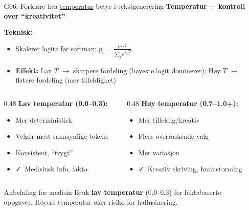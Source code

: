 \documentclass[aspectratio=169, 10pt]{beamer}
\begin{document}
\begin{frame}{G06: Forklare hva \href{https://en.wikipedia.org/wiki/Softmax_function\#Softmax_temperature}{temperatur} betyr i tekstgenerering}
    \textbf{Temperatur = kontroll over ``kreativitet''}

    \vspace{0.15cm}
    \textbf{Teknisk:}
    \begin{itemize}
        \item Skalerer logits før softmax: $p_i = \frac{e^{z_i/T}}{\sum_j e^{z_j/T}}$
        \item \textbf{Effekt:} Lav $T$ $\rightarrow$ skarpere fordeling (høyeste logit dominerer); Høy $T$ $\rightarrow$ flatere fordeling (mer tilfeldighet)
    \end{itemize}

    \vspace{0.2cm}
    \begin{columns}[T]
        \begin{column}{0.48\textwidth}
            \textbf{Lav temperatur (0.0--0.3):}
            \begin{itemize}
                \item Mer deterministisk
                \item Velger mest sannsynlige tokens
                \item Konsistent, ``trygt''
                \item \faCheck~Medisinsk info, fakta
            \end{itemize}
        \end{column}
        \begin{column}{0.48\textwidth}
            \textbf{Høy temperatur (0.7--1.0+):}
            \begin{itemize}
                \item Mer tilfeldig/kreativ
                \item Flere overraskende valg
                \item Mer variasjon
                \item \faCheck~Kreativ skriving, brainstorming
            \end{itemize}
        \end{column}
    \end{columns}

    \vspace{0.15cm}
    \begin{block}{\footnotesize Anbefaling for medisin}
        \footnotesize Bruk \textbf{lav temperatur} (0.0--0.3) for faktabaserte oppgaver. Høyere temperatur øker risiko for hallusinering.
    \end{block}
\end{frame}
\end{document}
